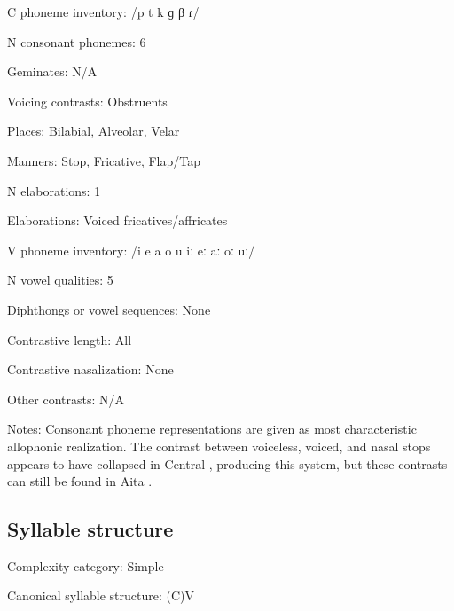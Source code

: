 {\begin{appendixdesc}
\item[C phoneme inventory:] /p t k ɡ β ɾ/

\item[N consonant phonemes:] 6

\item[Geminates:] N/A

\item[Voicing contrasts:] Obstruents

\item[Places:] Bilabial, Alveolar, Velar

\item[Manners:] Stop, Fricative, Flap/Tap

\item[N elaborations:] 1

\item[Elaborations:] Voiced fricatives/affricates

\item[V phoneme inventory:] /i e a o u iː eː aː oː uː/

\item[N vowel qualities:] 5

\item[Diphthongs or vowel sequences:] None

\item[Contrastive length:] All

\item[Contrastive nasalization:] None

\item[Other contrasts:] N/A

\item[Notes:] Consonant phoneme representations are given as most characteristic allophonic realization. The contrast between voiceless, voiced, and nasal stops appears to have collapsed in Central , producing this system, but these contrasts can still be found in Aita  \citep{Robinson2006}.
\end{appendixdesc}
\subsection*{Syllable structure}
\begin{appendixdesc}

\item[Complexity category:] Simple

\item[Canonical syllable structure:] (C)V \citep[28--29]{Robinson2011}


\end{appendixdesc}}
